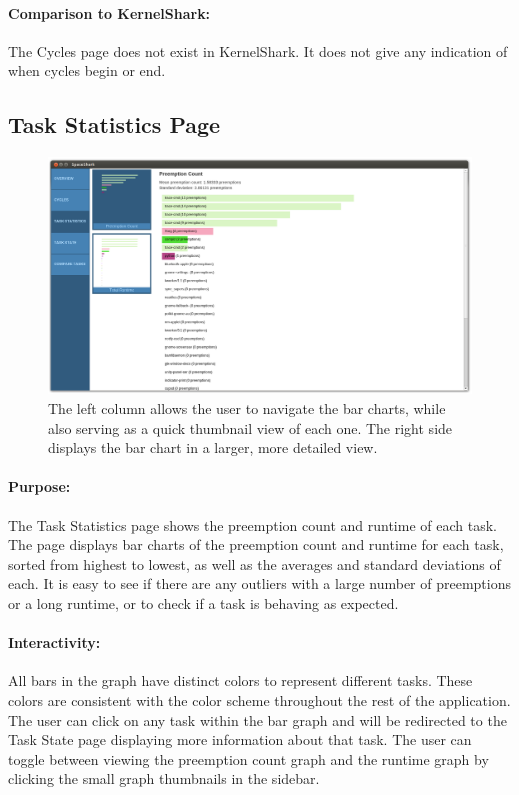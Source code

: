 \documentclass{hmcclinic}
\begin{document}
\paragraph{Comparison to KernelShark:}
    The Cycles page does not exist in KernelShark. It does not give any indication of when cycles begin or end.
    
  \subsection{Task Statistics Page} %

  \begin{figure}[H]
  \includegraphics[width=5in]{task-statistics-page.png}
  \caption{The left column allows the user to navigate the bar charts, while
    also serving as a quick thumbnail view of each one. The right side displays
  the bar chart in a larger, more detailed view.}
  \end{figure}

\paragraph{Purpose:}
The Task Statistics page shows the preemption count and runtime of each task.
The page displays bar charts of the preemption count and runtime for each task,
sorted from highest to lowest, as well as the averages and standard deviations
of each. It is easy to see if there are any outliers with a large number of
preemptions or a long runtime, or to check if a task is behaving as expected.

\paragraph{Interactivity:}
All bars in the graph have distinct colors to represent different tasks. These
colors are consistent with the color scheme throughout the rest of the
application. The user can click on any task within the bar graph and will be
redirected to the Task State page displaying more information about that task.
The user can toggle between viewing the preemption count graph and the runtime
graph by clicking the small graph thumbnails in the sidebar.
\end{document}
